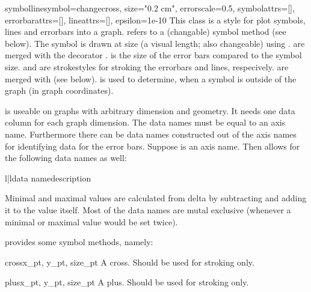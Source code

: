 \begin{classdesc}{symbolline}{symbol=changecross, size="0.2 cm",
                              errorscale=0.5, symbolattrs=[],
                              errorbarattrs=[], lineattrs=[],
                              epsilon=1e-10}
  This class is a style for plot symbols, lines and errorbars into a
  graph.  refers to a (changable) symbol method (see
  below). The symbol is drawn at size  (a visual \PyX{}
  length; also changeable) using . 
  are merged with the decorator . 
  is the size of the error bars compared to the symbol size.
   and  are strokestyles for
  stroking the errorbars and lines, respecively.  are
  merged with  (see below).  is used
  to determine, when a symbol is outside of the graph (in graph
  coordinates).

   is useable on graphs with arbitrary dimension and
  geometry. It needs one data column for each graph dimension. The
  data names must be equal to an axis name. Furthermore there can be
  data names constructed out of the axis names for identifying data
  for the error bars. Suppose  is an axis name. Then
   allows for the following data names as well:

  \begin{tableii}{l|l}{}{data name}{description}
  \end{tableii}

  Minimal and maximal values are calculated from delta by subtracting
  and adding it to the value itself. Most of the data names are mutal
  exclusive (whenever a minimal or maximal value would be set twice).
\end{classdesc}

 provides some symbol methods, namely:

\begin{methoddesc}{cross}{x_pt, y_pt, size_pt}
  A cross. Should be used for stroking only.
\end{methoddesc}

\begin{methoddesc}{plus}{x_pt, y_pt, size_pt}
  A plus. Should be used for stroking only.
\end{methoddesc}

